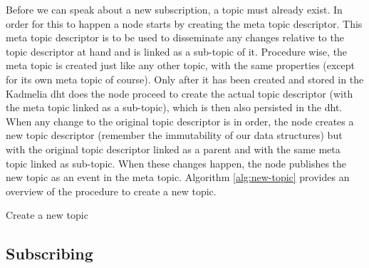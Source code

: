 Before we can speak about a new subscription, a topic must already exist. In
order for this to happen a node starts by creating the meta topic descriptor.
This meta topic descriptor is to be used to disseminate any changes relative to
the topic descriptor at hand and is linked as a sub-topic of it. Procedure
wise, the meta topic is created just like any other topic, with the same
properties (except for its own meta topic of course). Only after it has been
created and stored in the Kadmelia \acrshort{dht} does the node proceed to
create the actual topic descriptor (with the meta topic linked as a sub-topic),
which is then also persisted in the \acrshort{dht}. When any change to the
original topic descriptor is in order, the node creates a new topic descriptor
(remember the immutability of our data structures) but with the original topic
descriptor linked as a parent and with the same meta topic linked as sub-topic.
When these changes happen,  the node publishes the new topic as an event in the
meta topic.  Algorithm \ref{alg:new-topic} provides an overview of the
procedure to create a new topic.


\vspace{8pt}
\begin{algorithm}[H]
  \SetAlgoLined
  \caption{Create a new topic}
	\label{alg:new-topic}
\end{algorithm}
\vspace{8pt}

\subsection{Subscribing}\label{subsec:subscribing}

